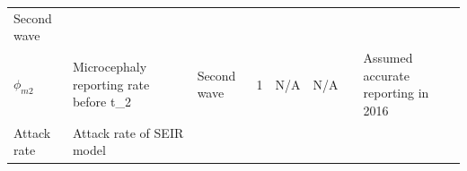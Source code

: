 \documentclass[10pt,letterpaper]{article}
\begin{document}
\begin{longtable}[]{@{}llllllll@{}}
\begin{minipage}[t]{0.05\columnwidth}
Second wave\strut
\end{minipage} & \begin{minipage}[t]{0.05\columnwidth}\raggedright\strut
\strut
\end{minipage} & \begin{minipage}[t]{0.04\columnwidth}\raggedright\strut
\strut
\end{minipage} & \begin{minipage}[t]{0.04\columnwidth}\raggedright\strut
\strut
\end{minipage} & \begin{minipage}[t]{0.14\columnwidth}\raggedright\strut
\strut
\end{minipage} & \begin{minipage}[t]{0.26\columnwidth}\raggedright\strut
\strut
\end{minipage}\tabularnewline
\begin{minipage}[t]{0.04\columnwidth}\raggedright\strut
\(\phi_{m2}\)\strut
\end{minipage} & \begin{minipage}[t]{0.17\columnwidth}\raggedright\strut
Microcephaly reporting rate before t\_2\strut
\end{minipage} & \begin{minipage}[t]{0.05\columnwidth}\raggedright\strut
Second wave\strut
\end{minipage} & \begin{minipage}[t]{0.05\columnwidth}\raggedright\strut
1\strut
\end{minipage} & \begin{minipage}[t]{0.04\columnwidth}\raggedright\strut
N/A\strut
\end{minipage} & \begin{minipage}[t]{0.04\columnwidth}\raggedright\strut
N/A\strut
\end{minipage} & \begin{minipage}[t]{0.14\columnwidth}\raggedright\strut
\strut
\end{minipage} & \begin{minipage}[t]{0.26\columnwidth}\raggedright\strut
Assumed accurate reporting in 2016\strut
\end{minipage}\tabularnewline
\begin{minipage}[t]{0.04\columnwidth}\raggedright\strut
Attack rate\strut
\end{minipage} & \begin{minipage}[t]{0.17\columnwidth}\raggedright\strut
Attack rate of SEIR model\strut
\end{minipage} & \begin{minipage}[t]{0.05\columnwidth}\raggedright\strut

\end{minipage}
\end{longtable}
\end{document}
